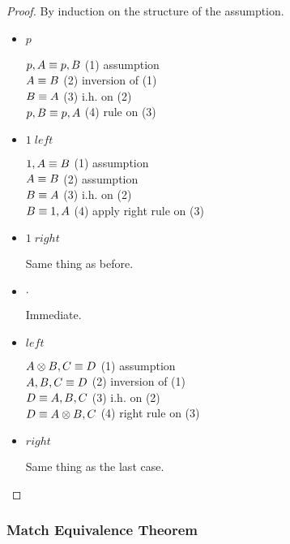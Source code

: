 \begin{proof}
   By induction on the structure of the assumption.
   
   \begin{itemize}
      \item $p$
      
      $p, A \equiv p, B$ \hfill (1) assumption \\
      $A \equiv B$ \hfill (2) inversion of (1) \\
      $B \equiv A$ \hfill (3) i.h. on (2) \\
      $p, B \equiv p, A$ \hfill (4) rule on (3) \\
      
      \item $1 \; left$
      
      $1, A \equiv B$ \hfill (1) assumption \\
      $A \equiv B$ \hfill (2) assumption \\
      $B \equiv A$ \hfill (3) i.h. on (2) \\
      $B \equiv 1, A$ \hfill (4) apply right rule on (3) \\
      
      \item $1 \; right$
      
      Same thing as before.
      
      \item $\cdot$
      
      Immediate.
      
      \item $left$
      
      $A \otimes B, C \equiv D$ \hfill (1) assumption \\
      $A, B, C \equiv D$ \hfill (2) inversion of (1) \\
      $D \equiv A, B, C$ \hfill (3) i.h. on (2) \\
      $D \equiv A \otimes B, C$ \hfill (4) right rule on (3) \\
      
      \item $right$
      
      Same thing as the last case.
   \end{itemize}
\end{proof}

\subsubsection{Match Equivalence Theorem}

